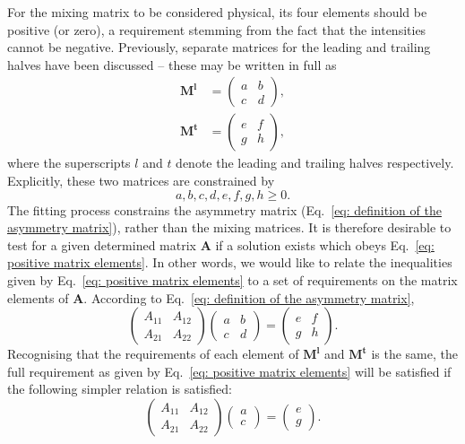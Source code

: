For the mixing matrix to be considered physical, its four elements should be positive (or zero), a requirement stemming from the fact that the intensities cannot be negative. Previously, separate matrices for the leading and trailing halves have been discussed -- these may be written in full as
\begin{align}
    \mathbf{M^l} &= \begin{pmatrix} a&b\\c&d\end{pmatrix},\\
    \mathbf{M^t} &= \begin{pmatrix} e&f\\g&h\end{pmatrix},
\end{align}
where the superscripts $l$ and $t$ denote the leading and trailing halves respectively. Explicitly, these two matrices are constrained by
\begin{equation}
    \label{eq: positive matrix elements}
    a,b,c,d,e,f,g,h \geq 0.
\end{equation}
The fitting process constrains the asymmetry matrix (Eq.~\eqref{eq: definition of the asymmetry matrix}), rather than the mixing matrices. It is therefore desirable to test for a given determined matrix $\mathbf{A}$ if a solution exists which obeys Eq.~\eqref{eq: positive matrix elements}. In other words, we would like to relate the inequalities given by Eq.~\eqref{eq: positive matrix elements} to a set of requirements on the matrix elements of $\mathbf{A}$. According to Eq.~\eqref{eq: definition of the asymmetry matrix},
\begin{equation}
    \label{eq: constraints on the asymmetry matrix}
    \begin{pmatrix} A_{11}&A_{12}\\A_{21}&A_{22}\end{pmatrix}\begin{pmatrix} a&b\\c&d\end{pmatrix} = \begin{pmatrix} e&f\\g&h\end{pmatrix}.
\end{equation}
Recognising that the requirements of each element of $\mathbf{M^l}$ and $\mathbf{M^t}$ is the same, the full requirement as given by Eq.~\eqref{eq: positive matrix elements} will be satisfied if the following simpler relation is satisfied:
\begin{equation}
    \label{eq: simpler constraints on the asymmetry matrix}
    \begin{pmatrix} A_{11}&A_{12}\\A_{21}&A_{22}\end{pmatrix}\begin{pmatrix} a\\c\end{pmatrix} = \begin{pmatrix} e\\g\end{pmatrix}.
\end{equation}

